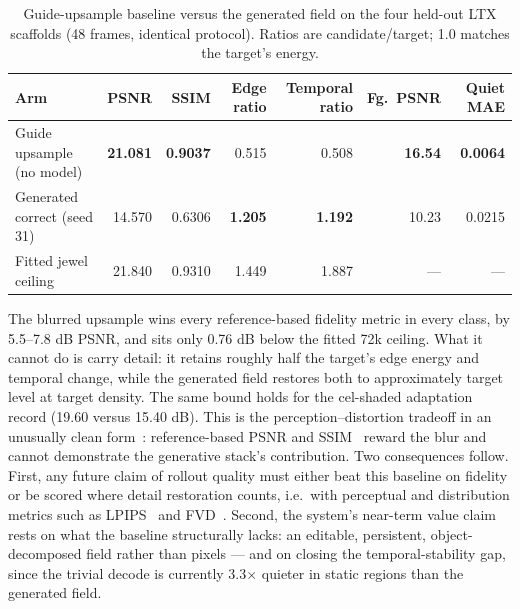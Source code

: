 \documentclass[10pt]{article}
\begin{document}
\begin{table}[H]
\centering
\small
\caption{Guide-upsample baseline versus the generated field on the four held-out LTX scaffolds
(48 frames, identical protocol). Ratios are candidate/target; 1.0 matches the target's energy.}
\label{tab:guidebaseline}
\begin{tabular}{@{}lrrrrrr@{}}
\toprule
Arm & PSNR & SSIM & Edge ratio & Temporal ratio & Fg.\ PSNR & Quiet MAE \\
\midrule
Guide upsample (no model) & \textbf{21.081} & \textbf{0.9037} & 0.515 & 0.508 & \textbf{16.54} & \textbf{0.0064} \\
Generated correct (seed 31) & 14.570 & 0.6306 & \textbf{1.205} & \textbf{1.192} & 10.23 & 0.0215 \\
Fitted jewel ceiling & 21.840 & 0.9310 & 1.449 & 1.887 & --- & --- \\
\bottomrule
\end{tabular}
\end{table}

The blurred upsample wins every reference-based fidelity metric in every class, by 5.5--7.8 dB
PSNR, and sits only 0.76 dB below the fitted 72k ceiling. What it cannot do is carry detail: it
retains roughly half the target's edge energy and temporal change, while the generated field
restores both to approximately target level at target density. The same bound holds for the
cel-shaded adaptation record (19.60 versus 15.40 dB). This is the perception--distortion tradeoff
in an unusually clean form~\citep{blau2018perception}: reference-based PSNR and
SSIM~\citep{wang2004ssim} reward the blur and cannot demonstrate the generative stack's
contribution. Two consequences follow. First, any future claim of rollout quality must either
beat this baseline on fidelity or be scored where detail restoration counts, i.e.\ with
perceptual and distribution metrics such as LPIPS~\citep{zhang2018lpips} and
FVD~\citep{unterthiner2018fvd}. Second, the system's near-term value claim rests on what the
baseline structurally lacks: an editable, persistent, object-decomposed field rather than pixels
--- and on closing the temporal-stability gap, since the trivial decode is currently 3.3\(\times\)
quieter in static regions than the generated field.
\end{document}
